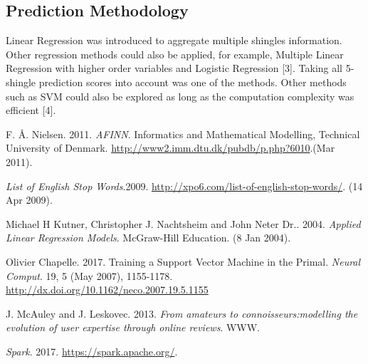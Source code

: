 \subsection{Prediction Methodology}
Linear Regression was introduced to aggregate multiple shingles information. Other regression methods could also be applied, for example, Multiple Linear Regression with higher order variables and Logistic Regression [3].  Taking all 5-shingle prediction scores into account was one of the methods. Other methods such as SVM could also be explored as long as the computation complexity was efficient [4].



\begin{thebibliography}{1}
	F. {\AA}. Nielsen.
	2011.
	{\em AFINN}.
	Informatics and Mathematical Modelling, Technical University of Denmark.
	\url{http://www2.imm.dtu.dk/pubdb/p.php?6010}.(Mar 2011).
	
	
	{\em List of English Stop Words}.2009.
	\url{http://xpo6.com/list-of-english-stop-words/}.
	(14 Apr 2009).

	Michael H Kutner, Christopher J. Nachtsheim and John Neter Dr..
	2004.
	{\em Applied Linear Regression Models}.
	McGraw-Hill Education.
	(8 Jan 2004).

	Olivier Chapelle. 2017. Training a Support Vector Machine in the Primal. {\em Neural Comput}. 19, 5 (May 2007), 1155-1178. \url{http://dx.doi.org/10.1162/neco.2007.19.5.1155}

	J. McAuley and J. Leskovec. 2013.
	{\em From amateurs to connoisseurs:modelling the evolution of user expertise through online reviews}.
	WWW.
	
	{\em Spark}. 2017.
	\url{https://spark.apache.org/}.
	
%
%
%
%



\end{thebibliography}
